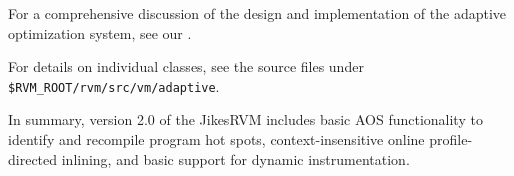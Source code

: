 For a comprehensive discussion of the design and implementation of the
adaptive optimization system, see our 
. 

For details on individual classes, see the source files under 
{\tt \$RVM\_ROOT/rvm/src/vm/adaptive}.

In summary, version 2.0 of the Jikes\trademark RVM includes basic AOS
functionality to identify and recompile program hot spots,
context-insensitive online profile-directed inlining, and basic
support for dynamic instrumentation. 

\JikesTMFooter

